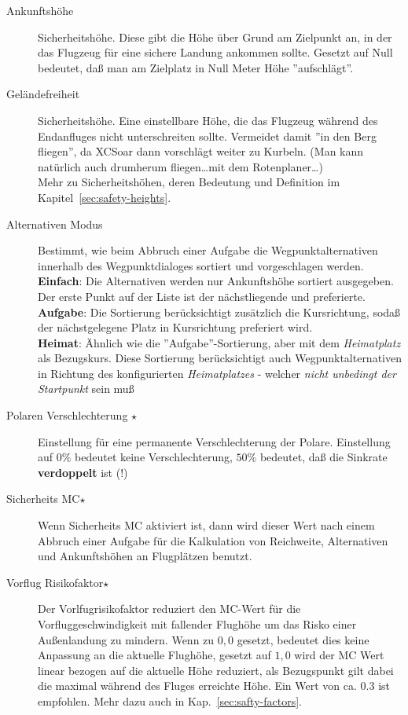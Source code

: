 \begin{description}
\item[Ankunftshöhe] Sicherheitshöhe.  Diese  gibt die Höhe über Grund am Zielpunkt an, in der das
Flugzeug für eine sichere Landung ankommen sollte. Gesetzt auf Null bedeutet, daß man am Zielplatz in Null Meter Höhe ''aufschlägt''.
\item[Geländefreiheit]  \label{conf:safetyterrain} Sicherheitshöhe. Eine einstellbare Höhe, die das Flugzeug während des Endanfluges
nicht unterschreiten sollte. Vermeidet damit ''in den Berg fliegen'', da \textsf{XCSoar} dann vorschlägt weiter zu Kurbeln. (Man kann natürlich auch
drumherum fliegen\dots mit dem Rotenplaner\dots)\\
Mehr zu Sicherheitshöhen, deren Bedeutung und Definition  im Kapitel~\ref{sec:safety-heights}.
\item[Alternativen Modus]  \label{conf:alternatesmode} Bestimmt, wie beim Abbruch einer Aufgabe die Wegpunktalternativen
innerhalb des Wegpunktdialoges sortiert und vorgeschlagen werden. \\
{\bf Einfach}: Die Alternativen werden nur Ankunftshöhe sortiert ausgegeben. Der erste Punkt auf der Liste ist der nächstliegende
und preferierte.\\
{\bf Aufgabe}: Die Sortierung berücksichtigt  zusätzlich die Kursrichtung, sodaß der nächstgelegene Platz in Kursrichtung
preferiert wird. \\
{\bf Heimat}:  Ähnlich wie die ''Aufgabe''-Sortierung, aber  mit dem \textsl{Heimatplatz} als Bezugskurs.   Diese Sortierung berücksichtigt
auch Wegpunktalternativen in Richtung des konfigurierten \textsl{Heimatplatzes}  - welcher \textsl{nicht unbedingt der Startpunkt} sein muß \achtung
\item[Polaren Verschlechterung $\star$] Einstellung für eine permanente Verschlechterung der Polare. Einstellung auf $0 \% $ bedeutet keine Verschlechterung,
$50 \% $ bedeutet, daß die Sinkrate \textbf{verdoppelt} ist (!)
\item[Sicherheits MC$\star$]  Wenn Sicherheits MC aktiviert ist, dann wird dieser Wert nach einem Abbruch einer Aufgabe
für die Kalkulation von Reichweite, Alternativen und Ankunftshöhen an Flugplätzen benutzt.
\item[Vorflug Risikofaktor$\star$]
 Der Vorlfugrisikofaktor reduziert den MC-Wert für die Vorfluggeschwindigkeit mit fallender Flughöhe um das Risko einer
 Außenlandung zu mindern. Wenn zu $0,0$ gesetzt, bedeutet dies keine Anpassung an die aktuelle Flughöhe, gesetzt auf $1,0$
wird der MC Wert linear bezogen auf die aktuelle Höhe reduziert, als Bezugspunkt gilt dabei die maximal während des
Fluges erreichte Höhe.
Ein Wert von ca. $0.3$ ist empfohlen.  Mehr dazu auch in Kap.~\ref{sec:safty-factors}.
\end{description}

